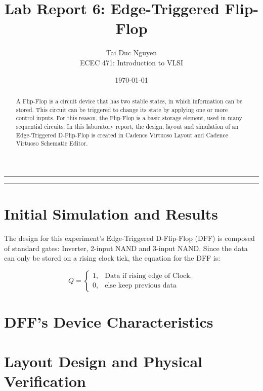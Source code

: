 \documentclass[letterpaper, 11pt]{article}
\title{Lab Report 6: Edge-Triggered Flip-Flop}
\author{
Tai Duc Nguyen \\
ECEC 471: Introduction to VLSI
}
\date{\today}
\begin{document}
\maketitle




\rule{\textwidth}{1pt}

\begin{abstract}
	A Flip-Flop is a circuit device that has two stable states, in which information can be stored. This circuit can be triggered to change its state by applying one or more control inputs. For this reason, the Flip-Flop is a basic storage element, used in many sequential circuits. In this laboratory report, the design, layout and simulation of an Edge-Triggered D-Flip-Flop is created in Cadence Virtuoso Layout and Cadence Virtuoso Schematic Editor.
\end{abstract}

\rule{\textwidth}{1pt}

\section{Initial Simulation and Results}
\label{sec:init_sim}

The design for this experiment's Edge-Triggered D-Flip-Flop (DFF) is composed of standard gates: Inverter, 2-input NAND and 3-input NAND. Since the data can only be stored on a rising clock tick, the equation for the DFF is:

\begin{equation}
Q=\begin{cases}
1, & \text{Data if rising edge of Clock}.\\
0, & \text{else keep previous data}
\end{cases}
\end{equation}

\section{DFF's Device Characteristics}
\label{sec:device_char}

\section{Layout Design and Physical Verification}
\label{sec:layout_phys_verify}
\end{document}
